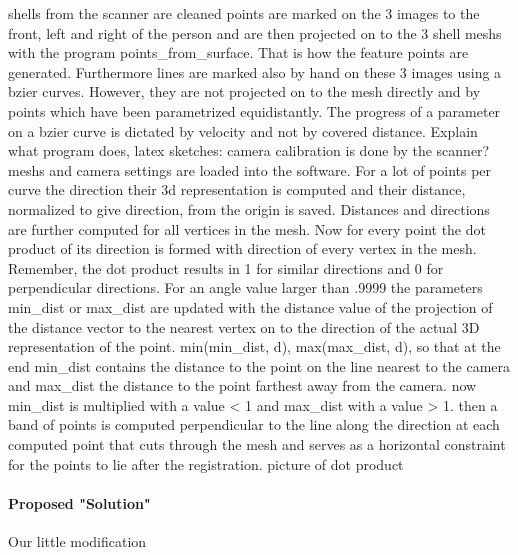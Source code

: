 shells from the scanner are cleaned
points are marked on the 3 images to the front, left and right of the person and are then projected on to the 3 shell meshs with the program points_from_surface. That is how the feature points are generated.
Furthermore lines are marked also by hand on these 3 images using a bzier curves. However, they are not projected on to the mesh directly and by points which have been parametrized equidistantly. The progress of a parameter on a bzier curve is dictated by velocity and not by covered distance.
Explain what program does, latex sketches:
camera calibration is done by the scanner?
meshs and camera settings are loaded into the software. For a lot of points per curve the direction their 3d representation is computed and their distance, normalized to give direction,  from the origin is saved. Distances and directions are further computed for all vertices in the mesh. Now for every point the dot product of its direction is formed with direction of every vertex in the mesh. Remember, the dot product results in 1 for similar directions and 0 for perpendicular directions.
For an angle value larger than .9999 the parameters min_dist or max_dist are updated with the distance value of the projection of the distance vector to the nearest vertex on to the direction of the actual 3D representation of the point. min(min_dist, d), max(max_dist, d), so that at the end min_dist contains the distance to the point on the line nearest to the camera and max_dist the distance to the point farthest away from the camera. now min_dist is multiplied with a value < 1 and
max_dist with a value > 1. 
then a band of points is computed perpendicular to the line along the direction at each computed point that cuts through the mesh and serves as a horizontal constraint for the points to lie after the registration.
picture of dot product

\paragraph{Proposed "Solution"}
Our little modification

